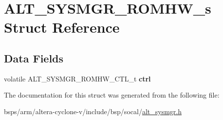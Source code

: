 \hypertarget{structALT__SYSMGR__ROMHW__s}{}\section{A\+L\+T\+\_\+\+S\+Y\+S\+M\+G\+R\+\_\+\+R\+O\+M\+H\+W\+\_\+s Struct Reference}
\label{structALT__SYSMGR__ROMHW__s}
\subsection*{Data Fields}
\begin{DoxyCompactItemize}
\item 
\mbox{\label{structALT__SYSMGR__ROMHW__s_a5c98f2baf8b40b842f1c7e97706bae79}} 
volatile A\+L\+T\+\_\+\+S\+Y\+S\+M\+G\+R\+\_\+\+R\+O\+M\+H\+W\+\_\+\+C\+T\+L\+\_\+t {\bfseries ctrl}
\end{DoxyCompactItemize}


The documentation for this struct was generated from the following file\+:\begin{DoxyCompactItemize}
\item 
bsps/arm/altera-\/cyclone-\/v/include/bsp/socal/\mbox{\hyperlink{alt__sysmgr_8h}{alt\+\_\+sysmgr.\+h}}\end{DoxyCompactItemize}
